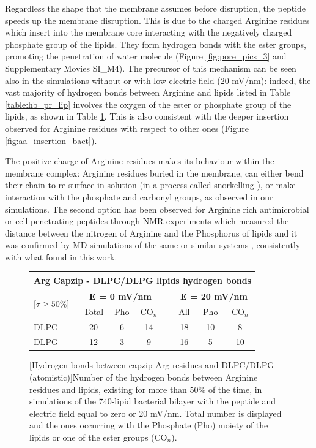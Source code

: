 Regardless the shape that the membrane assumes before disruption, the peptide speeds up the membrane disruption. This is due to the charged Arginine residues which insert into the membrane core interacting with the negatively charged phosphate group of the lipids. They form hydrogen bonds with the ester groups, promoting the penetration of water molecule (Figure \ref{fig:pore_pics_3} and Supplementary Movies SI\_M4).
%
The precursor of this mechanism can be seen also in the simulations without or with low electric field (20 mV/nm): indeed, the vast majority of hydrogen bonds between Arginine and lipids listed in Table \ref{table:hb_pr_lip} involves the oxygen of the ester or phosphate group of the lipids, as shown in Table \ref{table:hb_ester}. This is also consistent with the deeper insertion observed for Arginine residues with respect to other ones (Figure \ref{fig:aa_insertion_bact}).

The positive charge of Arginine residues makes its behaviour within the membrane complex: Arginine residues buried in the membrane, can either bend their chain to re-surface in solution (in a process called snorkelling \citep{Liang2005,Ulmschneider2017arg,Ojemalm2016}), or make interaction with the phosphate and carbonyl groups, as observed in our simulations. The second option has been observed for Arginine rich antimicrobial or cell penetrating peptides through NMR experiments which measured the distance between the nitrogen of Arginine and the Phosphorus of lipids \citep{Tang2007,Jobin2019} and it was confirmed by MD simulations of the same or similar systems \citep{Herce2009,Jobin2019}, consistently with what found in this work.


\begin{figure}[t!]
\centering
 \def\arraystretch{1.6}
\begin{tabular}{lcccccccc}
\multicolumn{9}{c}{\textbf{Arg Capzip - DLPC/DLPG lipids hydrogen bonds}} \\
\hline
\multicolumn{2}{l}{\multirow{2}{*}{[$\tau \ge 50$\%]}} & \multicolumn{3}{c}{\textbf{E = 0 mV/nm}} && \multicolumn{3}{c}{\textbf{E = 20 mV/nm}} \\
\cline{3-9}
&& Total & Pho & CO$_n$ && All & Pho & CO$_n$ \\ 
\hline
DLPC && 20 & 6 & 14 && 18 & 10 & 8 \\
DLPG && 12 & 3 & 9 && 16 & 5 & 10 \\
\hline
 \end{tabular}
[Hydrogen bonds between capzip Arg residues and DLPC/DLPG (atomistic)]{Number of the hydrogen bonds between Arginine residues and lipids, existing for more than 50\% of the time, in simulations of the 740-lipid bacterial bilayer with the peptide and electric field equal to zero or 20 mV/nm. Total number is displayed and the ones occurring with the Phosphate (Pho) moiety of the lipids or one of the ester groups (CO$_n$).}
\label{table:hb_ester}
\end{figure}


